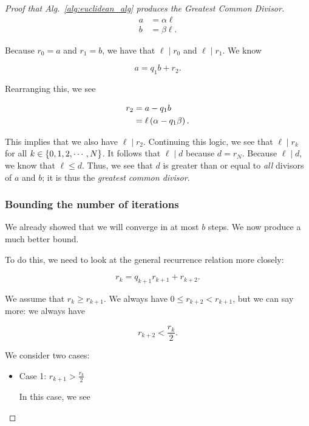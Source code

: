 \begin{proof}[Proof that Alg.~\ref{alg:euclidean_alg} produces the
    Greatest Common Divisor]
\begin{align}
    a &= \alpha \ell \nonumber\\
    b &= \beta \ell.
\end{align}

\noindent
Because $r_{0}=a$ and $r_{1}=b$, we have that $\ell\mid r_{0}$
and $\ell\mid r_{1}$.
We know

\begin{equation}
    a = q_{1}b + r_{2}.
\end{equation}

\noindent
Rearranging this, we see

\begin{align}
    r_{2} &= a - q_{1}b \nonumber\\
        &= \ell\left( \alpha - q_{1}\beta \right).
\end{align}

\noindent
This implies that we also have $\ell \mid r_{2}$.
Continuing this logic, we see that
$\ell \mid r_{k}$ for all $k\in\left\{ 0, 1, 2, \cdots, N \right\}$.
It follows that $\ell \mid d$ because $d = r_{N}$.
Because $\ell \mid d$, we know that $\ell\le d$.
Thus, we see that $d$ is greater than or equal to \emph{all} divisors
of $a$ and $b$;
it is thus the \emph{greatest common divisor}.

\subsubsection*{Bounding the number of iterations}
We already showed that we will converge in at most $b$ steps.
We now produce a much better bound.

To do this, we need to look at the general recurrence relation more closely:

\begin{equation}
    r_{k} = q_{k+1}r_{k+1} + r_{k+2}.
\end{equation}

\noindent
We assume that $r_{k}\ge r_{k+1}$.
We always have $0\le r_{k+2} < r_{k+1}$,
but we can say more:
we always have

\begin{equation}
    r_{k+2} < \frac{r_{k}}{2}.
\end{equation}

We consider two cases:

\begin{itemize}
\item Case 1: $r_{k+1} > \frac{r_{k}}{2}$

In this case, we see


\end{itemize}
\end{proof}
